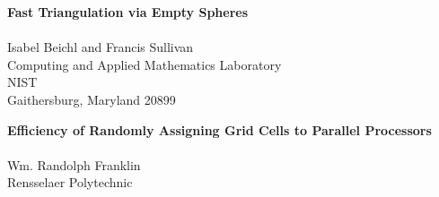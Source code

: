 \newpage

\begin{center}
{\large\bf Fast Triangulation via Empty Spheres}\\
\quad\\
Isabel Beichl and Francis Sullivan\\
Computing and Applied Mathematics Laboratory\\
NIST\\
Gaithersburg, Maryland 20899
\end{center}

\begin{abstract}
We describe a new method for constructing the Delaunay triangulation based on
direct determination of the centers of the empty spheres defined by the 
Delaunay simplices.  Centers are found by a search technique called 
``squeezing'' that is based on the fact that {\em non}-Delaunay simplices
determine non-empty spheres.  Binary search can be used to find the correct 
center in $O(\log n)$ squeeze steps.  Each such step requires identification 
of the nearest neighbor of the current center.  The overall complexity of the 
method is thus $O(T(n)*\log^2 n),$ where $T(n)$ is the number of simplices 
generated by $n$ input points.  Experiments in {\em Mathematica} indicate that 
the method is extremely numerically stable.

We will comment briefly on a possible parallel version of the algorithm
having parallel complexity $O(\log^2 n)$.  The idea here is to use shelling
order as a key for assembling the triangulation from a concordance of the
neighborhoods of the input points.
\end{abstract}

\vfill
\begin{center}
{\large\bf 
Efficiency of Randomly Assigning Grid Cells to Parallel Processors}\\
\quad\\
Wm. Randolph Franklin\\
Rensselaer Polytechnic
\end{center}

